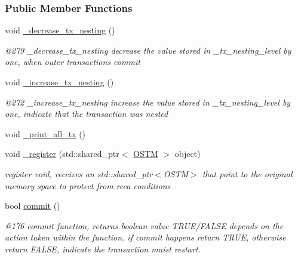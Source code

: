 \subsubsection*{Public Member Functions}
\begin{DoxyCompactItemize}
\item 
void \hyperlink{class_t_x_aa3ac499f576326588628ade96b27b4b1_aa3ac499f576326588628ade96b27b4b1}{\+\_\+decrease\+\_\+tx\+\_\+nesting} ()
\begin{DoxyCompactList}\small\item\em @279 \+\_\+decrease\+\_\+tx\+\_\+nesting decrease the value stored in \+\_\+tx\+\_\+nesting\+\_\+level by one, when outer transactions commit \end{DoxyCompactList}\item 
void \hyperlink{class_t_x_a1384bdf12d795854b5d32e7f61ffbdb8_a1384bdf12d795854b5d32e7f61ffbdb8}{\+\_\+increase\+\_\+tx\+\_\+nesting} ()
\begin{DoxyCompactList}\small\item\em @272 \+\_\+increase\+\_\+tx\+\_\+nesting increase the value stored in \+\_\+tx\+\_\+nesting\+\_\+level by one, indicate that the transaction was nested \end{DoxyCompactList}\item 
void \hyperlink{class_t_x_a3d96ed91eb9ec73e16589f705661c5a7_a3d96ed91eb9ec73e16589f705661c5a7}{\+\_\+print\+\_\+all\+\_\+tx} ()
\item 
void \hyperlink{class_t_x_abc32af2f51df97ac483e5bfe7db6ca6e_abc32af2f51df97ac483e5bfe7db6ca6e}{\+\_\+register} (std\+::shared\+\_\+ptr$<$ \hyperlink{class_o_s_t_m}{O\+S\+TM} $>$ object)
\begin{DoxyCompactList}\small\item\em register void, receives an std\+::shared\+\_\+ptr$<$\+O\+S\+T\+M$>$ that point to the original memory space to protect from reca conditions \end{DoxyCompactList}\item 
bool \hyperlink{class_t_x_a9dde5d356b35e557448e58d260087356_a9dde5d356b35e557448e58d260087356}{commit} ()
\begin{DoxyCompactList}\small\item\em @176 commit function, returns boolean value T\+R\+U\+E/\+F\+A\+L\+SE depends on the action taken within the function. if commit happens return T\+R\+UE, otherwise return F\+A\+L\+SE, indicate the transaction muist restart. \end{DoxyCompactList}\item 

\end{DoxyCompactItemize}
